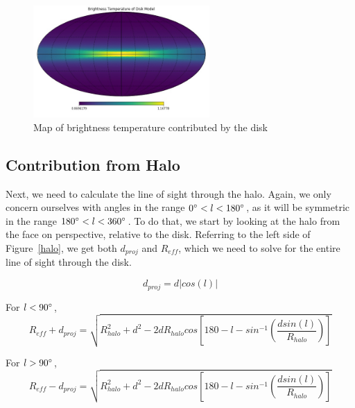 \documentclass[letterpaper, 10pt]{article}
\begin{document}
\begin{figure}[h]
\begin{center}
\includegraphics[width=0.6\textwidth]{disk.jpg}
\caption{Map of brightness temperature contributed by the disk}
\label{disk_map}
\end{center}
\end{figure}

\subsection{Contribution from Halo}
Next, we need to calculate the line of sight through the halo. Again, we only concern ourselves with angles in the range $ 0\degree < l < 180\degree $, as it will be symmetric in the range $ 180\degree < l < 360\degree $. To do that, we start by looking at the halo from the face on perspective, relative to the disk. Referring to the left side of Figure~\ref{halo}, we get both $d_{proj}$ and $R_{eff}$, which we need to solve for the entire line of sight through the disk.

\[ d_{proj} = d|cos(l)| \]

For $ l < 90\degree $, 
\[ R_{eff} + d_{proj} = \sqrt{R_{halo}^{2} + d^{2} - 2dR_{halo}cos\left[180 - l - sin^{-1}\left(\frac{dsin(l)}{R_{halo}}\right)\right]} \]

For $ l > 90\degree $, 
\[R_{eff} - d_{proj} = \sqrt{R_{halo}^{2} + d^{2} - 2dR_{halo}cos\left[180 - l - sin^{-1}\left(\frac{dsin(l)}{R_{halo}}\right)\right]} \]
\end{document}
